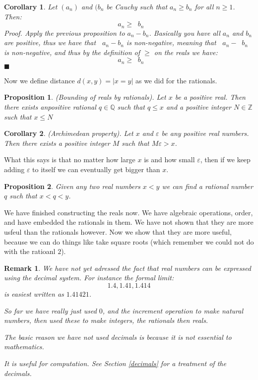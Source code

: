 \documentclass{article}
\newtheorem{remark}{Remark}[subsection]
\newtheorem{proposition}{Proposition}[subsection]
\newtheorem{corollary}{Corollary}[subsection]
\newcommand{\Q}{\mathbb{Q}}
\newcommand{\Z}{\mathbb{Z}}
\newcommand{\vep}{\varepsilon} %
\DeclareMathOperator{\infLIM}{\mathrm{LIM}_{n \to \infty}}
\let\it\textit
\begin{document}
\begin{corollary}
	Let $(a_n)$ and $(b_n$ be Cauchy 
	such that $a_n \geq b_n$ for all 
	$n \geq 1$. Then:
	$$
	\infLIM a_n \geq \infLIM b_n
	$$
	\it{Proof}. Apply the previous 
	proposition to $a_n - b_n$. 
	Basically you have all $a_n$ and 
	$b_n$ are positive, thus we 
	have that $\infLIM a_n - b_n$ 
	is non-negative, meaning 
	that  $\infLIM a_n - \infLIM b_n$ 
	is non-negative, and thus 
	by the definition of $\geq$ 
	on the reals we have: 
	$$
	\infLIM a_n \geq \infLIM b_n 
	$$
	\hfill $\blacksquare$
\end{corollary}

Now we define distance 
$d(x,y) = |x = y|$ as we did for the rationals. 


\begin{proposition}
\label{bounding-of-reals-by-rationals}
	(Bounding of reals by rationals). Let 
	$x$ be a positive real. Then there
	exists anpositive rational 
	$q \in \Q$ such that 
	$q \leq x$ and a positive 
	integer $N\in\Z$ such that $x \leq N$ 
\end{proposition}

\begin{corollary}
\label{archimedean-property}
	(Archimedean property). Let $x$ and $\vep$ 
	be any positive real numbers. Then 
	there exists a positive integer 
	$M$ such that $M\vep > x$.
\end{corollary}

What this says is that no matter how large $x$ is 
and how small $\vep$, then if we keep adding 
$\vep$ to itself we can eventually 
get bigger than $x$.

\begin{proposition}
	Given any two real numbers $x < y$ we can find 
	a rational number $q$ such that $x < q < y$.
\end{proposition}

We have finished constructing the reals now.
We have algebraic operations, order, and have 
embedded the rationals in them. We 
have not shown that they are more
usfeul than the rationals however.
Now we show that they are more useful, 
because we can do things like take 
square roots (which remember we could 
not do with the ratioanl $2$).

\begin{remark}
	We have not yet adressed the fact 
	that real numbers can be expressed using the
	decimal system. For instance the formal 
	limit: 
	$$
	1.4, 1.41, 1.414
	$$
	is easiest written as $1.41421$. 

	So far we have really just 
	used $0$, and the increment 
	operation to make natural 
	numbers, then used 
	these to make integers, 
	the rationals then reals.

	The basic reason we have not 
	used decimals is because it is 
	not essential to mathematics.
	
	It is useful for computation. See
	Section \ref{decimals} for 
	a treatment of the decimals.
\end{remark}
\end{document}
